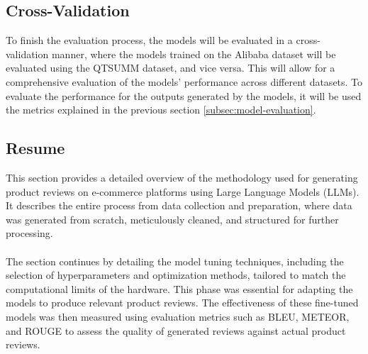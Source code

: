\subsection{Cross-Validation}
To finish the evaluation process, the models will be evaluated in a cross-validation manner, where the models trained on the Alibaba dataset will be evaluated using the QTSUMM dataset, and vice versa. This will allow for a comprehensive evaluation of the models' performance across different datasets. To evaluate the performance for the outputs generated by the models, it will be used the metrics explained in the previous section \ref{subsec:model-evaluation}.

\subsection{Resume}
This section provides a detailed overview of the methodology used for generating product reviews on e-commerce platforms using Large Language Models (LLMs). It describes the entire process from data collection and preparation, where data was generated from scratch, meticulously cleaned, and structured for further processing.
\\\\
The section continues by detailing the model tuning techniques, including the selection of hyperparameters and optimization methods, tailored to match the computational limits of the hardware. This phase was essential for adapting the models to produce relevant product reviews. The effectiveness of these fine-tuned models was then measured using evaluation metrics such as BLEU, METEOR, and ROUGE to assess the quality of generated reviews against actual product reviews.